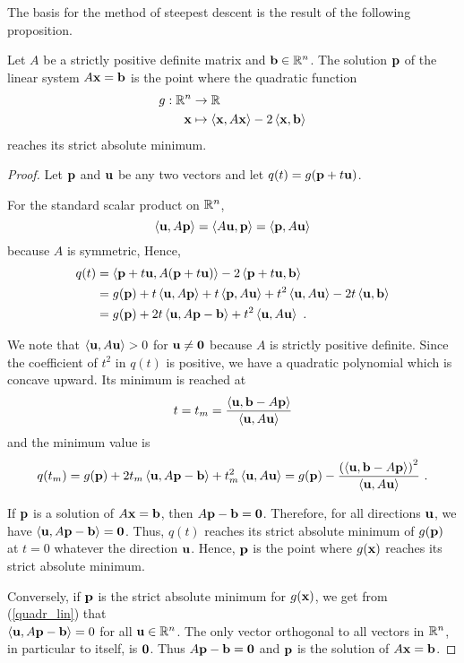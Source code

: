 The basis for the method of steepest descent is the
result of the following proposition.

\begin{prop}
Let $A$ be a strictly positive definite matrix and $\mathbf{b}\in\mathbb{R}^n$.
The solution $\mathbf{p}$ of the linear system $A\mathbf{x} = \mathbf{b}$ is
the point where the quadratic function 
\begin{align*}
g:\mathbb{R}^n & \rightarrow \mathbb{R} \\
\mathbf{x} & \mapsto \left\langle{\mathbf{x}} , {A\mathbf{x}}\right\rangle - 2 \left\langle{\mathbf{x}} , {\mathbf{b}}\right\rangle
\end{align*}
reaches its strict absolute minimum.
\label{steepestdescgfunct}
\end{prop}

\begin{proof}
Let $\mathbf{p}$ and $\mathbf{u}$ be any two vectors and let
$q(t) = g(\mathbf{p}+t\mathbf{u})$.

For the standard scalar product on $\mathbb{R}^n$,
\[
\left\langle{\mathbf{u}} , {A\mathbf{p}}\right\rangle = \left\langle{A\mathbf{u}} , {\mathbf{p}}\right\rangle = \left\langle{\mathbf{p}} , {A\mathbf{u}}\right\rangle
\]
because $A$ is symmetric,  Hence,
\begin{align*}
q(t) &= \left\langle{\mathbf{p}+t\mathbf{u}} , {A(\mathbf{p}+t\mathbf{u})}\right\rangle
- 2 \left\langle{\mathbf{p}+t\mathbf{u}} , {\mathbf{b}}\right\rangle \\
&= g(\mathbf{p}) + t \left\langle{\mathbf{u}} , {A\mathbf{p}}\right\rangle + t\left\langle{\mathbf{p}} , {A\mathbf{u}}\right\rangle
+ t^2 \left\langle{\mathbf{u}} , {A\mathbf{u}}\right\rangle -2 t\left\langle{\mathbf{u}} , {\mathbf{b}}\right\rangle \\
&= g(\mathbf{p}) + 2t \left\langle{\mathbf{u}} , {A\mathbf{p}-\mathbf{b}}\right\rangle
+ t^2 \left\langle{\mathbf{u}} , {A\mathbf{u}}\right\rangle \ .
\end{align*}

We note that $\left\langle{\mathbf{u}} , {A\mathbf{u}}\right\rangle > 0$ for $\mathbf{u} \neq \mathbf{0}$
because $A$ is strictly positive definite.  Since the coefficient of
$t^2$ in $q(t)$ is positive, we have a quadratic polynomial which is
concave upward.  Its minimum is reached at
\[
t = t_m = \frac{\left\langle{\mathbf{u}} , {\mathbf{b} - A\mathbf{p}}\right\rangle}{\left\langle{\mathbf{u}} , {A\mathbf{u}}\right\rangle}
\]
and the minimum value is
\begin{equation}\label{quadr_lin}
q(t_m) = g(\mathbf{p}) + 2t_m \left\langle{\mathbf{u}} , {A\mathbf{p}-\mathbf{b}}\right\rangle
+ t_m^2 \left\langle{\mathbf{u}} , {A\mathbf{u}}\right\rangle
= g(\mathbf{p}) - \frac{ \left(\left\langle{\mathbf{u}} , {\mathbf{b}- A\mathbf{p}}\right\rangle\right)^2}
{\left\langle{\mathbf{u}} , {A\mathbf{u}}\right\rangle} \ .
\end{equation}

If $\mathbf{p}$ is a solution of $A\mathbf{x}=\mathbf{b}$, then
$A\mathbf{p} - \mathbf{b} = \mathbf{0}$.  Therefore, for all directions $\mathbf{u}$,
we have $\left\langle{\mathbf{u}} , {A\mathbf{p} - \mathbf{b}}\right\rangle = \mathbf{0}$.  Thus, $q(t)$
reaches its strict absolute minimum of $g(\mathbf{p})$ at $t=0$ whatever
the direction $\mathbf{u}$.  Hence, $\mathbf{p}$ is the point where $g(\mathbf{x})$
reaches its strict absolute minimum.

Conversely, if $\mathbf{p}$ is the strict absolute minimum for
$g(\mathbf{x})$, we get from (\ref{quadr_lin}) that \\
$\left\langle{\mathbf{u}} , {A\mathbf{p} - \mathbf{b}}\right\rangle = 0$ for all $\mathbf{u} \in \mathbb{R}^n$.
The only vector orthogonal to all vectors in $\mathbb{R}^n$, in particular to
itself, is $\mathbf{0}$.
Thus $A\mathbf{p} - \mathbf{b}=\mathbf{0}$ and $\mathbf{p}$ is the solution of
$A\mathbf{x}=\mathbf{b}$.
\end{proof}

